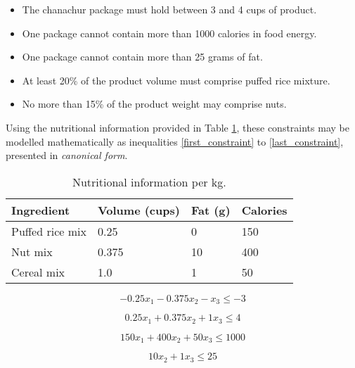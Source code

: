 \documentclass[11pt, a4paper]{article}
\begin{document}
    \begin{itemize}
        \item The chanachur package must hold between 3 and 4 cups of product.
        \item One package cannot contain more than 1000 calories in food energy.
        \item One package cannot contain more than 25 grams of fat.
        \item At least 20\% of the product volume must comprise puffed rice mixture.
        \item No more than 15\% of the product weight may comprise nuts.
    \end{itemize}

    Using the nutritional information provided in Table \ref{nutrients}, these constraints may be modelled mathematically as inequalities \ref{first_constraint} to \ref{last_constraint}, presented in \textit{canonical form}.

    \begin{table}[!ht]
        \centering
        \caption{Nutritional information per kg.}
        \begin{tabular}{|l|l|l|l|}
            \hline
            Ingredient      & Volume (cups)     & Fat (g)   & Calories  \\ \hline
            Puffed rice mix & 0.25              & 0         & 150       \\ \hline
            Nut mix         & 0.375             & 10        & 400       \\ \hline
            Cereal mix      & 1.0               & 1         & 50        \\ \hline          
        \end{tabular}
        \label{nutrients}
    \end{table}

    \begin{equation}
        -0.25x_1 - 0.375x_2 - x_3 \leq -3
        \label{first_constraint}
    \end{equation}

    \begin{equation}
        0.25x_1 + 0.375x_2 + 1x_3 \leq 4
    \end{equation}
    
    \begin{equation}
        150x_1 + 400x_2 + 50x_3 \leq 1000
    \end{equation}

    \begin{equation}
        10x_2 + 1x_3 \leq 25
    \end{equation}
\end{document}
